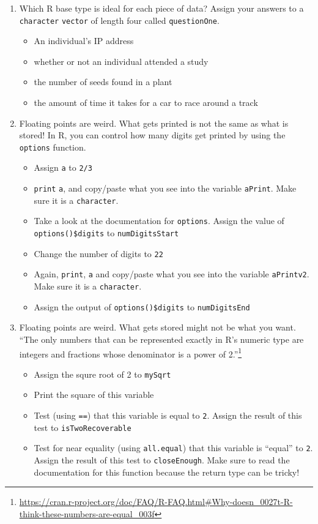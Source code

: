 \documentclass[
  12pt,
]{krantz}
\providecommand{\tightlist}{%
  \setlength{\itemsep}{0pt}\setlength{\parskip}{0pt}}
\renewcommand{\href}[2]{#2\footnote{\url{#1}}}
\begin{document}
\begin{enumerate}
\def\labelenumi{\arabic{enumi}.}
\item
  Which R base type is ideal for each piece of data? Assign your answers to a \texttt{character} \texttt{vector} of length four called \texttt{questionOne}.

  \begin{itemize}
  \tightlist
  \item
    An individual's IP address
  \item
    whether or not an individual attended a study
  \item
    the number of seeds found in a plant
  \item
    the amount of time it takes for a car to race around a track
  \end{itemize}
\item
  Floating points are weird. What gets printed is not the same as what is stored! In R, you can control how many digits get printed by using the \texttt{options} function.

  \begin{itemize}
  \tightlist
  \item
    Assign \texttt{a} to \texttt{2/3}
  \item
    \texttt{print} \texttt{a}, and copy/paste what you see into the variable \texttt{aPrint}. Make sure it is a \texttt{character}.
  \item
    Take a look at the documentation for \texttt{options}. Assign the value of \texttt{options()\$digits} to \texttt{numDigitsStart}
  \item
    Change the number of digits to \texttt{22}
  \item
    Again, \texttt{print}, \texttt{a} and copy/paste what you see into the variable \texttt{aPrintv2}. Make sure it is a \texttt{character}.
  \item
    Assign the output of \texttt{options()\$digits} to \texttt{numDigitsEnd}
  \end{itemize}
\item
  Floating points are weird. What gets stored might not be what you want. \href{https://cran.r-project.org/doc/FAQ/R-FAQ.html\#Why-doesn_0027t-R-think-these-numbers-are-equal_003f}{``The only numbers that can be represented exactly in R's numeric type are integers and fractions whose denominator is a power of 2.''}

  \begin{itemize}
  \tightlist
  \item
    Assign the squre root of 2 to \texttt{mySqrt}
  \item
    Print the square of this variable
  \item
    Test (using \texttt{==}) that this variable is equal to \texttt{2}. Assign the result of this test to \texttt{isTwoRecoverable}
  \item
    Test for near equality (using \texttt{all.equal}) that this variable is ``equal'' to \texttt{2}. Assign the result of this test to \texttt{closeEnough}. Make sure to read the documentation for this function because the return type can be tricky!
  \end{itemize}
\end{enumerate}
\end{document}
